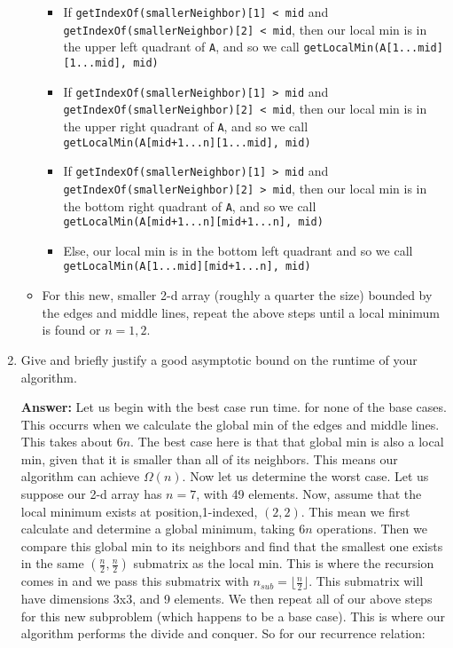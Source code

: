 \documentclass[11pt, oneside]{article}   	%
\theoremstyle{definition}
\theoremstyle{remark}
\newcommand\floor[1]{\lfloor#1\rfloor}
\begin{document}
\begin{enumerate}
\begin{itemize}
   \begin{itemize}
   \item If  \texttt{getIndexOf(smallerNeighbor)[1] < mid} and      \texttt{getIndexOf(smallerNeighbor)[2] < mid}, then our local min is in the upper left quadrant of \texttt{A}, and so we call \texttt{getLocalMin(A[1...mid][1...mid], mid)}
   \item If \texttt{getIndexOf(smallerNeighbor)[1] > mid} and      \texttt{getIndexOf(smallerNeighbor)[2] < mid}, then our local min is in the upper right quadrant of \texttt{A}, and so we call \texttt{getLocalMin(A[mid+1...n][1...mid], mid)}
   \item If \texttt{getIndexOf(smallerNeighbor)[1] > mid} and      \texttt{getIndexOf(smallerNeighbor)[2] > mid}, then our local min is in the bottom right quadrant of \texttt{A}, and so we call \texttt{getLocalMin(A[mid+1...n][mid+1...n], mid)}
   \item Else, our local min is in the bottom left quadrant and so we call \\
    \texttt{getLocalMin(A[1...mid][mid+1...n], mid)}
   \end{itemize}
   \item For this new, smaller 2-d array (roughly a quarter the size) bounded by the edges and middle lines, repeat the above steps until a local minimum is found or $n=1,2$.
   \end{itemize}
\item Give and briefly justify a good asymptotic bound on the runtime of
   your algorithm.
   
   \textbf{Answer: } Let us begin with the best case run time. for none of the base cases. This occurrs when we calculate the global min of the edges and middle lines. This takes about $6n$. The best case here is that that global min is also a local min, given that it is smaller than all of its neighbors. This means our algorithm can achieve $\Omega(n)$. Now let us determine the worst case. Let us suppose our 2-d array has $n=7$, with 49 elements. Now, assume that the local minimum exists at position,1-indexed, $(2,2)$. This mean we first calculate and determine a global minimum, taking $6n$ operations. Then we compare this global min to its neighbors and find that the smallest one exists in the same $(\frac{n}{2}, \frac{n}{2})$ submatrix as the local min. This is where the recursion comes in and we pass this submatrix with $n_{sub}=\floor{\frac{n}{2}}$. This submatrix will have dimensions 3x3, and 9 elements. We then repeat all of our above steps for this new subproblem (which happens to be a base case). This is where our algorithm performs the divide and conquer. So for our recurrence relation:
   

\end{enumerate}
\end{document}
